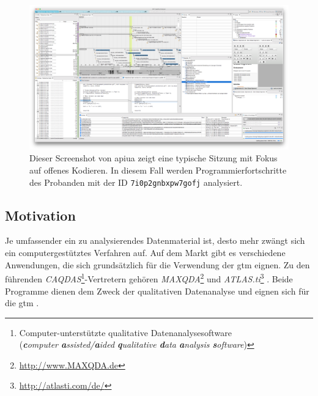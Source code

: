 \thispagestyle{empty}
\begin{landscape}
\begin{figure}
  \centering
    \includegraphics[width=1.0\linewidth]{Figures/apiua/opencoding-devel.png}
  \caption[APIUA: Offenes Kodieren]{Dieser Screenshot von \gls{apiua} zeigt eine typische Sitzung mit Fokus auf offenes Kodieren. In diesem Fall werden Programmierfortschritte des Probanden mit der ID \texttt{7i0p2gnbxpw7gofj} analysiert.}
  \label{fig:apiua-opencoding-devel}
\end{figure}
\end{landscape}
\restoregeometry






\subsection{Motivation}

Je umfassender ein zu analysierendes Datenmaterial ist, desto mehr zwängt sich ein computergestütztes Verfahren auf. Auf dem Markt gibt es verschiedene Anwendungen, die sich grundsätzlich für die Verwendung der \gls{gtm} eignen. Zu den führenden \textit{CAQDAS}\footnote{Computer-unterstützte qualitative Datenanalysesoftware\\(\textit{\textbf{c}omputer \textbf{a}ssisted/\textbf{a}ided \textbf{q}ualitative \textbf{d}ata \textbf{a}nalysis \textbf{s}oftware})}-Vertretern gehören \textit{MAXQDA}\footnote{\url{http://www.MAXQDA.de}} und \textit{ATLAS.ti}\footnote{\url{http://atlasti.com/de/}} \citep{ann2007using}. Beide Programme dienen dem Zweck der qualitativen Datenanalyse und eignen sich für die \gls{gtm} \citep{Wolf:2014vv,Dresing:2006te,ann2007using}.

